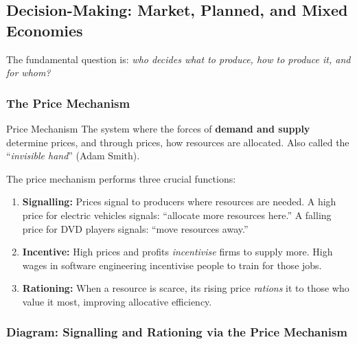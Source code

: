 \documentclass[11pt, a4paper, twoside]{book}
\begin{document}
\subsection{Decision-Making: Market, Planned, and Mixed Economies}

The fundamental question is: \emph{who decides what to produce, how to produce it, and for whom?}

\subsubsection{The Price Mechanism}

\begin{keyterm}{Price Mechanism}
The system where the forces of \textbf{demand and supply} determine prices, and through prices, how resources are allocated. Also called the ``\emph{invisible hand}'' (Adam Smith).
\end{keyterm}

The price mechanism performs three crucial functions:

\begin{enumerate}
  \item \textbf{Signalling:} Prices signal to producers where resources are needed. A high price for electric vehicles signals: ``allocate more resources here.'' A falling price for DVD players signals: ``move resources away.''
  \item \textbf{Incentive:} High prices and profits \emph{incentivise} firms to supply more. High wages in software engineering incentivise people to train for those jobs.
  \item \textbf{Rationing:} When a resource is scarce, its rising price \emph{rations} it to those who value it most, improving allocative efficiency.
\end{enumerate}

\subsubsection{Diagram: Signalling and Rationing via the Price Mechanism}
\end{document}
